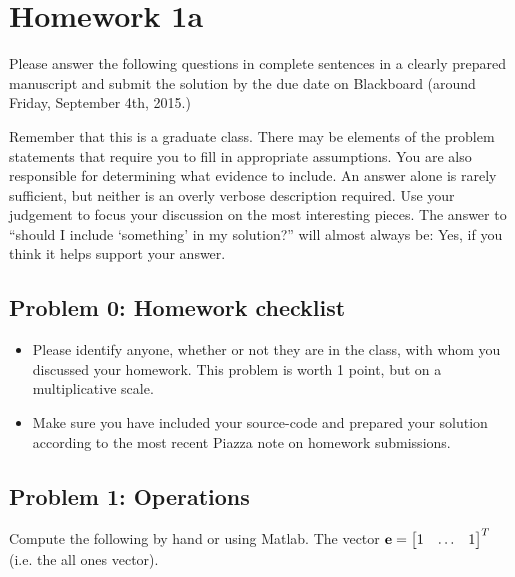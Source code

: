 \documentclass{article}
\begin{document}
 
\hypertarget{homework_1a_1}{}\section*{{Homework 1a}}\label{homework_1a_1}

Please answer the following questions in complete sentences in a clearly prepared manuscript and submit the solution by the due date on Blackboard (around Friday, September 4th, 2015.)

Remember that this is a graduate class. There may be elements of the problem statements that require you to fill in appropriate assumptions. You are also responsible for determining what evidence to include. An answer alone is rarely sufficient, but neither is an overly verbose description required. Use your judgement to focus your discussion on the most interesting pieces. The answer to ``{}should I include `{}something'{} in my solution?''{} will almost always be: Yes, if you think it helps support your answer.

\hypertarget{problem_0_homework_checklist_2}{}\subsection*{{Problem 0: Homework checklist}}\label{problem_0_homework_checklist_2}

\begin{itemize}%
\item Please identify anyone, whether or not they are in the class, with whom you discussed your homework. This problem is worth 1 point, but on a multiplicative scale.


\item Make sure you have included your source-code and prepared your solution according to the most recent Piazza note on homework submissions.



\end{itemize}
\hypertarget{problem_1_operations_3}{}\subsection*{{Problem 1: Operations}}\label{problem_1_operations_3}

Compute the following by hand or using Matlab. The vector $\boldsymbol{\mathrm{e}} = \begin{bmatrix} 1 & \ldots & 1 \end{bmatrix}^T$ (i.e. the all ones vector).
\end{document}
